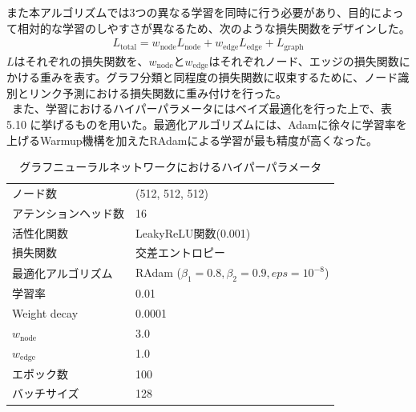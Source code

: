 また本アルゴリズムでは3つの異なる学習を同時に行う必要があり、目的によって相対的な学習のしやすさが異なるため、次のような損失関数をデザインした。\\
\begin{align}
L_{\mathrm{total}} = w_{\mathrm{node}} L_{\mathrm{node}} + w_{\mathrm{edge}} L_{\mathrm{edge}} +  L_{\mathrm{graph}}
\end{align}
$L$はそれぞれの損失関数を、$w_\mathrm{{node}}とw_\mathrm{{edge}}$はそれぞれノード、エッジの損失関数にかける重みを表す。グラフ分類と同程度の損失関数に収束するために、ノード識別とリンク予測における損失関数に重み付けを行った。\\
\ また、学習におけるハイパーパラメータにはベイズ最適化を行った上で、表 5.10%
に挙げるものを用いた。最適化アルゴリズムには、Adamに徐々に学習率を上げるWarmup機構を加えたRAdamによる学習が最も精度が高くなった。
\begin{table}[H]
 \centering
  \begin{tabular}{ l  l }
   \hline
   ノード数 & (512, 512, 512)\\
   アテンションヘッド数 & 16\\
   活性化関数 & LeakyReLU関数(0.001)\\
   損失関数 & 交差エントロピー\\
   最適化アルゴリズム & RAdam ($\beta_1 = 0.8, \beta_2 = 0.9, eps = 10^{-8}$)\\
   学習率 & 0.01\\
   Weight decay & 0.0001\\
    $w_{\mathrm{node}}$ & 3.0\\
    $w_{\mathrm{edge}}$ & 1.0\\
   エポック数 & 100\\
   バッチサイズ & 128\\
   \hline
  \end{tabular}
  \label{gnnsetting}
  \caption{グラフニューラルネットワークにおけるハイパーパラメータ}
\end{table}
